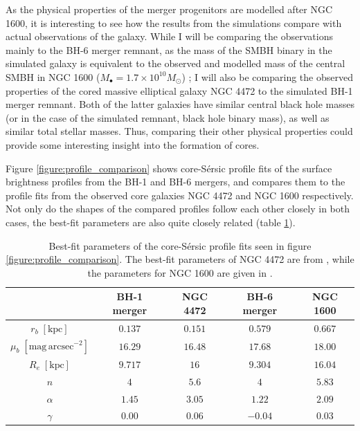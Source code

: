 \documentclass[english, oneside]{HYgradu}
\begin{document}
As the physical properties of the merger progenitors are modelled after NGC 1600, it is interesting to see how the results from the simulations compare with actual observations of the galaxy. While I will be comparing the observations mainly to the BH-6 merger remnant, as the mass of the SMBH binary in the simulated galaxy is equivalent to the observed and modelled mass of the central SMBH in NGC 1600 ($M_\bullet = 1.7 \times 10^{10} M_\odot$) \citep{Thomas2016}; I will also be comparing the observed properties of the cored massive elliptical galaxy NGC 4472 to the simulated BH-1 merger remnant. Both of the latter galaxies have similar central black hole masses (or in the case of the simulated remnant, black hole binary mass), as well as similar total stellar masses. Thus, comparing their other physical properties could provide some interesting insight into the formation of cores.

Figure \ref{figure:profile_comparison} shows core-Sérsic profile fits of the surface brightness profiles from the BH-1 and BH-6 mergers, and compares them to the profile fits from the observed core galaxies NGC 4472 and NGC 1600 respectively. Not only do the shapes of the compared profiles follow each other closely in both cases, the best-fit parameters are also quite closely related (table \ref{table:bestfit_parameter_comparison}). 

\begin{table}
	\begin{center}
		\scriptsize
		\begin{tabular}{| c | c c | c c |}
		\hline
		 & BH-1 merger & NGC 4472 & BH-6 merger & NGC 1600 \\
		\hline
		$r_b \; \mathrm{[kpc]}$ & $0.137$ & $0.151$ & $0.579$ & $0.667$ \\
		$\mu_b \; \mathrm{[mag \, arcsec^{-2}]}$ & $16.29$ & $16.48$ & $17.68$ & $18.00$ \\
		$R_e \; \mathrm{[kpc]}$ & $9.717$ & $16$ & $9.304$ & $16.04$ \\
		$n$ & $4$ & $5.6$ & $4$ & $5.83$ \\
		$\alpha$ & $1.45$ & $3.05$ & $1.22$ & $2.09$ \\
		$\gamma$ & $0.00$ & $0.06$ & $-0.04$ & $0.03$ \\
		\hline
		\end{tabular}
	\end{center}
	\caption{Best-fit parameters of the core-Sérsic profile fits seen in figure \ref{figure:profile_comparison}. The best-fit parameters of NGC 4472 are from \cite{Rusli2013}, while the parameters for NGC 1600 are given in \cite{Thomas2016}.}
	\label{table:bestfit_parameter_comparison}
\end{table}
\end{document}
